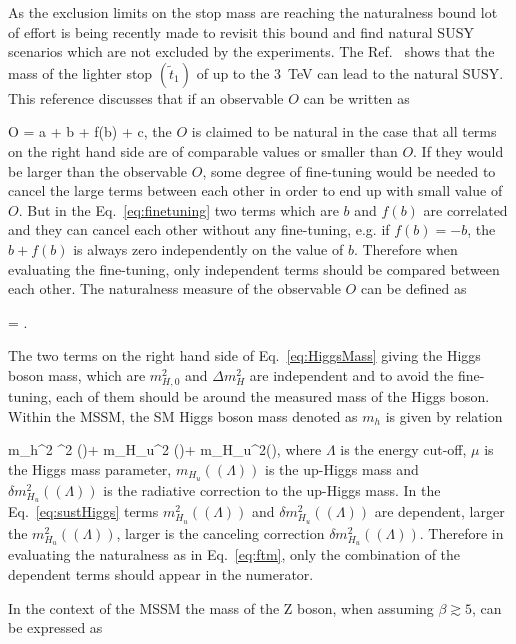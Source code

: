 As the exclusion limits on the stop mass are reaching the naturalness bound lot of effort is being recently made to revisit this bound and find natural SUSY scenarios which are not excluded by the experiments. The Ref.~\cite{Baer:2016bwh} shows that the mass of the lighter stop $(\tilde{t}_{1})$ of up to the 3~TeV can lead to the natural SUSY. This reference discusses that if an observable $O$ can be written as

{
O = a + b + f(b) + c,
}
the $O$ is claimed to be natural in the case that all terms on the right hand side are of comparable values or smaller than $O$. If they would be larger than the observable $O$, some degree of fine-tuning would be needed to cancel the large terms between each other in order to end up with small value of $O$. But in the Eq.~\ref{eq:finetuning} two terms which are $b$ and $f(b)$ are correlated and they can cancel each other without any fine-tuning, e.g. if $f(b) = -b$, the $b+f(b)$ is always zero independently on the value of $b$. Therefore when evaluating the fine-tuning, only independent terms should be compared between each other. The naturalness measure of the observable $O$ can be defined as 

{
\Delta = .
}

The two terms on the right hand side of  Eq.~\ref{eq:HiggsMass} giving the Higgs boson mass, which are $m_{H,0}^{2}$ and $\Delta m_{H}^{2}$ are independent and to avoid the fine-tuning, each of them should be around the measured mass of the Higgs boson. Within the MSSM, the SM Higgs boson mass denoted as $m_{h}$ is given by relation

{
m_{h}^{2}  \mu^{2} (\Lambda)+ m_{H_{u}}^{2} (\Lambda)+ \delta m_{H_{u}}^{2}(\Lambda),
}
where $\Lambda$ is the energy cut-off, $\mu$ is the Higgs mass parameter, $m_{H_{u}}((\Lambda))$ is the up-Higgs mass and $\delta m_{H_{u}}^{2}((\Lambda))$ is the radiative correction to the up-Higgs mass. In the Eq.~\ref{eq:sustHiggs} terms $m_{H_{u}}^{2} ((\Lambda))$ and  $\delta m_{H_{u}}^{2} ((\Lambda))$ are dependent, larger the $m_{H_{u}}^{2} ((\Lambda))$, larger is the canceling correction  $\delta m_{H_{u}}^{2} ((\Lambda))$. Therefore in evaluating the naturalness as in Eq.~\ref{eq:ftm}, only the combination of the dependent terms should appear in the numerator.

In the context of the MSSM the mass of the Z boson, when assuming $\beta \gtrsim 5 $, can be expressed as 

